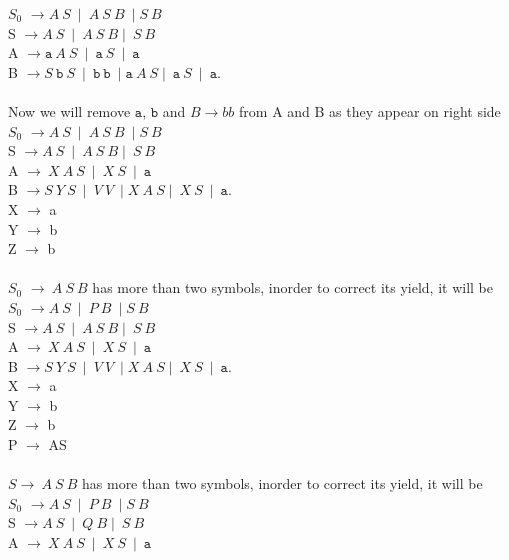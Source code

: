 \documentclass[a4page]{exam}
\newcommand{\Str}[1]{\mathtt{#1}}
\begin{document}
\begin{questions}
$S_{0}$ $\rightarrow A \ S \ \mid \ A \ S \ B \ \mid S \ B $\\
S $\rightarrow A\ S\ \mid \ A \ S \ B \mid \ S \ B   $\\
    A $\rightarrow \Str{a}\ A\ S\ \mid\  \Str{a}\ S \ \mid\ \Str{a}$ \\
    B $\rightarrow S\ \Str{b}\ S\ \mid\ \Str{b} \ \Str{b}\ \mid \Str{a} \ A \ S \mid \ \Str{a} \ S \ \mid \ \Str{a}$.\\
\\
Now we will remove $\Str{a}$, $\Str{b}$ and $B \rightarrow bb$ from A and B as they appear on right side\\
$S_{0}$ $\rightarrow A \ S \ \mid \ A \ S \ B \ \mid S \ B $\\
S $\rightarrow A\ S\ \mid \ A \ S \ B \mid \ S \ B   $\\
    A $\rightarrow \ X\ A\ S\ \mid\  X \ S \ \mid\ \Str{a}$ \\
    B $\rightarrow S\ Y \ S\ \mid\ V\ V\ \mid X \ A \ S \mid \ X \ S \ \mid \ \Str{a}$.\\
X $\rightarrow$ a\\
Y $\rightarrow$ b\\
Z $\rightarrow$ b\\
\\
$S_{0}$ $\rightarrow \ A \ S \ B $ has more than two symbols, inorder to correct its yield, it will be\\
$S_{0}$ $\rightarrow A \ S \ \mid \ P \ B \ \mid S \ B $\\
S $\rightarrow A\ S\ \mid \ A \ S \ B \mid \ S \ B   $\\
    A $\rightarrow \ X\ A\ S\ \mid\  X \ S \ \mid\ \Str{a}$ \\
    B $\rightarrow S\ Y \ S\ \mid\ V\ V\ \mid X \ A \ S \mid \ X \ S \ \mid \ \Str{a}$.\\
X $\rightarrow$ a\\
Y $\rightarrow$ b\\
Z $\rightarrow$ b\\
P $\rightarrow$ AS\\
\\
$S \rightarrow \ A \ S \ B $ has more than two symbols, inorder to correct its yield, it will be\\
$S_{0}$ $\rightarrow A \ S \ \mid \ P \ B \ \mid S \ B $\\
S $\rightarrow A\ S\ \mid \ Q \ B \mid \ S \ B   $\\
    A $\rightarrow \ X\ A\ S\ \mid\  X \ S \ \mid\ \Str{a}$ \\

\end{questions}
\end{document}
